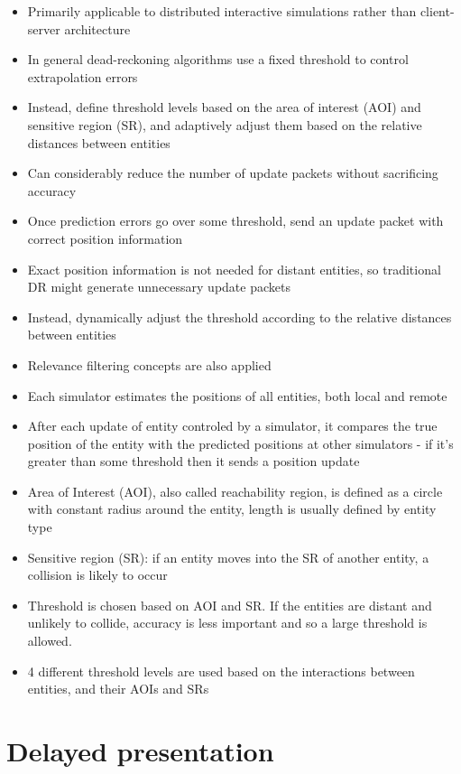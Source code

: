 \documentclass[conference]{IEEEtran}
\begin{document}
	\begin{itemize}
		\item Primarily applicable to distributed interactive simulations rather than client-server architecture
		\item In general dead-reckoning algorithms use a fixed threshold to control extrapolation errors
		\item Instead, define threshold levels based on the area of interest (AOI) and sensitive region (SR), and adaptively adjust them based on the relative distances between entities
		\item Can considerably reduce the number of update packets without sacrificing accuracy
		\item Once prediction errors go over some threshold, send an update packet with correct position information
		\item Exact position information is not needed for distant entities, so traditional DR might generate unnecessary update packets
		\item Instead, dynamically adjust the threshold according to the relative distances between entities
		\item Relevance filtering concepts are also applied
		\item Each simulator estimates the positions of all entities, both local and remote
		\item After each update of entity controled by a simulator, it compares the true position of the entity with the predicted positions at other simulators - if it's greater than some threshold then it sends a position update
		\item Area of Interest (AOI), also called reachability region, is defined as a circle with constant radius around the entity, length is usually defined by entity type
		\item Sensitive region (SR): if an entity moves into the SR of another entity, a collision is likely to occur
		\item Threshold is chosen based on AOI and SR. If the entities are distant and unlikely to collide, accuracy is less important and so a large threshold is allowed.
		\item 4 different threshold levels are used based on the interactions between entities, and their AOIs and SRs
	\end{itemize}

	\section{Delayed presentation}
\end{document}
